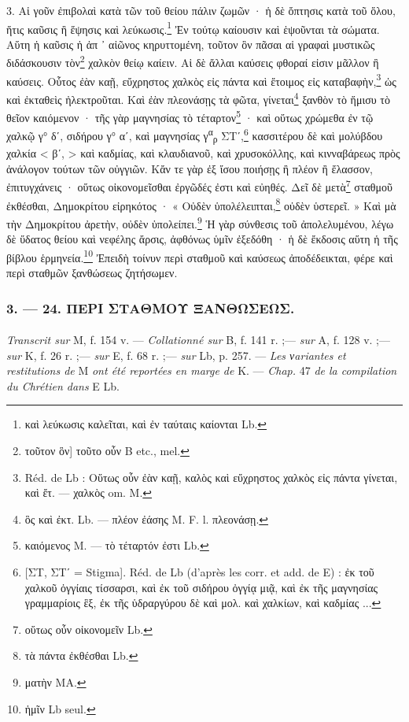 \documentclass[a4paper, 11pt, oneside, polutonikogreek, french]{article}
\begin{document}
3. Αἱ γοῦν ἐπιβολαὶ κατὰ τῶν τοῦ θείου πάλιν ζωμῶν · ἡ δὲ ὄπτησις κατὰ τοῦ ὅλου, ἥτις καῦσις ἢ ἕψησις καὶ λεύκωσις.\footnote{καὶ λεύκωσις καλεῖται, καὶ ἐν ταύταις καίονται Lb.} Ἐν τούτῳ καίουσιν καὶ ἑψοῦνται τὰ σώματα. Αὕτη ἡ καῦσις ἡ ἀπ ᾽ αἰῶνος κηρυττομένη, τοῦτον ὃν πᾶσαι αἱ γραφαὶ μυστικῶς διδάσκουσιν τὸν\footnote{τοῦτον ὃν] τοῦτο οὖν B etc., mel.} χαλκὸν θείῳ καίειν. Αἱ δὲ ἄλλαι καύσεις φθοραί εἰσιν μᾶλλον ἢ καύσεις. Οὗτος ἐὰν καῇ, εὔχρηστος χαλκὸς εἰς πάντα καὶ ἔτοιμος εἰς καταβαφὴν,\footnote{Réd. de Lb : Οὕτως οὖν ἐὰν καῇ, καλὸς καὶ εὔχρηστος χαλκὸς εἰς πάντα γίνεται, καὶ ἔτ. --- χαλκὸς om. M.} ὡς καὶ ἐκταθεὶς ἠλεκτροῦται. Καὶ ἐὰν πλεονάσῃς τὰ φῶτα, γίνεται\footnote{ὃς καὶ ἐκτ. Lb. --- πλέον ἐάσης M. F. l. πλεονάσῃ.} ξανθὸν τὸ ἥμισυ τὸ θεῖον καιόμενον · τῆς γὰρ μαγνησίας τὸ τέταρτον\footnote{καιόμενος M. --- τὸ τέταρτόν ἐστι Lb.} · καὶ οὕτως χρώμεθα ἐν τῷ χαλκῷ γ° δʹ, σιδήρου γ° αʹ, καὶ μαγνησίας γ\textsuperscript{α}\textsubscript{ρ} ΣΤʹ,\footnote{[ΣΤ, ΣΤʹ = Stigma]. Réd. de Lb (d'après les corr. et add. de E) : ἐκ τοῦ χαλκοῦ ὀγγίαις τίσσαρσι, καὶ ἐκ τοῦ σιδήρου ὀγγίᾳ μιᾷ, καὶ ἐκ τῆς μαγνησίας γραμμαρίοις ἓξ, ἐκ τῆς ὑδραργύρου δὲ καὶ μολ. καὶ χαλκίων, καὶ καδμίας ...} κασσιτέρου δὲ καὶ μολύβδου χαλκία < βʹ, > καὶ καδμίας, καὶ κλαυδιανοῦ, καὶ χρυσοκόλλης, καὶ κινναβάρεως πρὸς ἀνάλογον τούτων τῶν οὐγγιῶν. Κἄν τε γὰρ ἐξ ἴσου ποιήσῃς ἢ πλέον ἢ ἔλασσον, ἐπιτυγχάνεις · οὕτως οἰκονομεῖσθαι ἐργῶδές ἐστι καὶ εὐηθές. Δεῖ δὲ μετὰ\footnote{οὕτως οὖν οἰκονομεῖν Lb.} σταθμοῦ ἐκθέσθαι, Δημοκρίτου εἰρηκότος · « Οὐδὲν ὑπολέλειπται,\footnote{τὰ πάντα ἐκθέσθαι Lb.} οὐδὲν ὑστερεῖ. » Καὶ μὰ τὴν Δημοκρίτου ἀρετὴν, οὐδὲν ὑπολείπει.\footnote{ματὴν MA.} Ἡ γὰρ σύνθεσις τοῦ ἀπολελυμένου, λέγω δὲ ὕδατος θείου καὶ νεφέλης ἄρσις, ἀφθόνως ὑμῖν ἐξεδόθη · ἡ δὲ ἔκδοσις αὕτη ἡ τῆς βίβλου ἑρμηνεία.\footnote{ἡμῖν Lb seul.} Ἐπειδὴ τοίνυν περὶ σταθμοῦ καὶ καύσεως ἀποδέδεικται, φέρε καὶ περὶ σταθμῶν ξανθώσεως ζητήσωμεν.

\bigskip
\centerline{\EightStarTaper}
\centerline{\EightStarTaper\EightStarTaper}
\bigskip

\subsubsection{3. --- 24. ΠΕΡΙ ΣΤΑΘΜΟΥ ΞΑΝΘΩΣΕΩΣ.}
\paragraph{}
\emph{Transcrit sur} M, f. 154 v. --- \emph{Collationné sur} B, f. 141 r. ;--- \emph{sur} A, f. 128 v. ;--- \emph{sur} K, f. 26 r. ;--- \emph{sur} E, f. 68 r. ;--- \emph{sur} Lb, p. 257. --- \emph{Les νariantes et restitutions de} M \emph{ont été reportées en marge de} K. --- \emph{Chap.} 47 \emph{de la compilation du Chrétien dans} E Lb.
\end{document}
